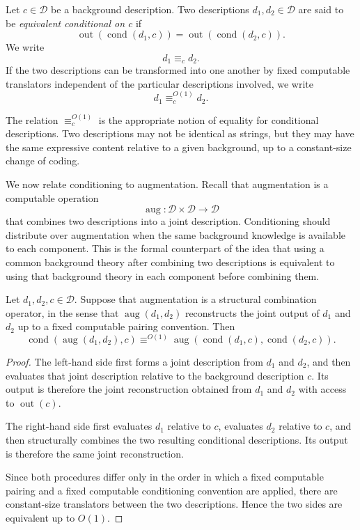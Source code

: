 \begin{definition}
\label{def:conditional_equivalence}
Let \(c\in\mathcal D\) be a background description. Two descriptions
\(d_1,d_2\in\mathcal D\) are said to be \emph{equivalent conditional on \(c\)}
 if
\[
\operatorname{out}(\operatorname{cond}(d_1,c))
=
\operatorname{out}(\operatorname{cond}(d_2,c)).
\]
We write
\[
d_1\equiv_c d_2.
\]
If the two descriptions can be transformed into one another by fixed
computable translators independent of the particular descriptions involved, we
write
\[
d_1\equiv_c^{O(1)} d_2.
\]
\end{definition}

The relation \(\equiv_c^{O(1)}\) is the appropriate notion of equality for
conditional descriptions. Two descriptions may not be identical as strings, but
they may have the same expressive content relative to a given background, up to
a constant-size change of coding.

We now relate conditioning to augmentation. Recall that augmentation is a
computable operation
\[
\operatorname{aug}:\mathcal D\times\mathcal D\to\mathcal D
\]
that combines two descriptions into a joint description. Conditioning should
distribute over augmentation when the same background knowledge is available to
each component. This is the formal counterpart of the idea that using a common
background theory after combining two descriptions is equivalent to using that
background theory in each component before combining them.

\begin{proposition}
\label{prop:conditioning_distributes_over_augmentation}
Let \(d_1,d_2,c\in\mathcal D\). Suppose that augmentation is a structural
combination operator, in the sense that
\(\operatorname{aug}(d_1,d_2)\) reconstructs the joint output of \(d_1\) and
\(d_2\) up to a fixed computable pairing convention. Then
\[
\operatorname{cond}(\operatorname{aug}(d_1,d_2),c)
\equiv^{O(1)}
\operatorname{aug}(\operatorname{cond}(d_1,c),\operatorname{cond}(d_2,c)).
\]
\end{proposition}

\begin{proof}
The left-hand side first forms a joint description from \(d_1\) and \(d_2\),
and then evaluates that joint description relative to the background
description \(c\). Its output is therefore the joint reconstruction obtained
from \(d_1\) and \(d_2\) with access to \(\operatorname{out}(c)\).

The right-hand side first evaluates \(d_1\) relative to \(c\), evaluates
\(d_2\) relative to \(c\), and then structurally combines the two resulting
conditional descriptions. Its output is therefore the same joint reconstruction.

Since both procedures differ only in the order in which a fixed computable
pairing and a fixed computable conditioning convention are applied, there are
constant-size translators between the two descriptions. Hence the two sides are
equivalent up to \(O(1)\).
\end{proof}


